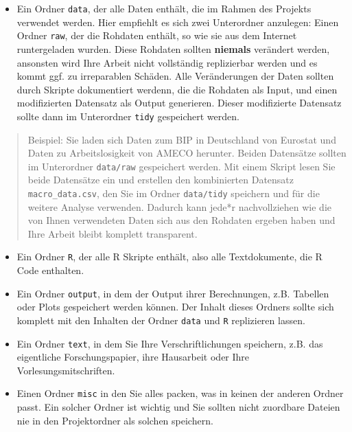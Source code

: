 \documentclass[]{tufte-book}
\providecommand{\tightlist}{%
  \setlength{\itemsep}{0pt}\setlength{\parskip}{0pt}}
\begin{document}
\begin{itemize}
\tightlist
\item
  Ein Ordner \texttt{data}, der alle Daten enthält, die im Rahmen des
  Projekts verwendet werden. Hier empfiehlt es sich zwei Unterordner
  anzulegen: Einen Ordner \texttt{raw}, der die Rohdaten enthält, so wie
  sie aus dem Internet runtergeladen wurden. Diese Rohdaten sollten
  \textbf{niemals} verändert werden, ansonsten wird Ihre Arbeit nicht
  vollständig replizierbar werden und es kommt ggf. zu irreparablen
  Schäden. Alle Veränderungen der Daten sollten durch Skripte
  dokumentiert werdenn, die die Rohdaten als Input, und einen
  modifizierten Datensatz als Output generieren. Dieser modifizierte
  Datensatz sollte dann im Unterordner \texttt{tidy} gespeichert werden.
\end{itemize}

\begin{quote}
Beispiel: Sie laden sich Daten zum BIP in Deutschland von Eurostat und
Daten zu Arbeitslosigkeit von AMECO herunter. Beiden Datensätze sollten
im Unterordner \texttt{data/raw} gespeichert werden. Mit einem Skript
lesen Sie beide Datensätze ein und erstellen den kombinierten Datensatz
\texttt{macro\_data.csv}, den Sie im Ordner \texttt{data/tidy} speichern
und für die weitere Analyse verwenden. Dadurch kann jede*r
nachvollziehen wie die von Ihnen verwendeten Daten sich aus den Rohdaten
ergeben haben und Ihre Arbeit bleibt komplett transparent.
\end{quote}

\begin{itemize}
\item
  Ein Ordner \texttt{R}, der alle R Skripte enthält, also alle
  Textdokumente, die R Code enthalten.
\item
  Ein Ordner \texttt{output}, in dem der Output ihrer Berechnungen, z.B.
  Tabellen oder Plots gespeichert werden können. Der Inhalt dieses
  Ordners sollte sich komplett mit den Inhalten der Ordner \texttt{data}
  und \texttt{R} replizieren lassen.
\item
  Ein Ordner \texttt{text}, in dem Sie Ihre Verschriftlichungen
  speichern, z.B. das eigentliche Forschungspapier, ihre Hausarbeit oder
  Ihre Vorlesungsmitschriften.
\item
  Einen Ordner \texttt{misc} in den Sie alles packen, was in keinen der
  anderen Ordner passt. Ein solcher Ordner ist wichtig und Sie sollten
  nicht zuordbare Dateien nie in den Projektordner als solchen
  speichern.
\end{itemize}
\end{document}
